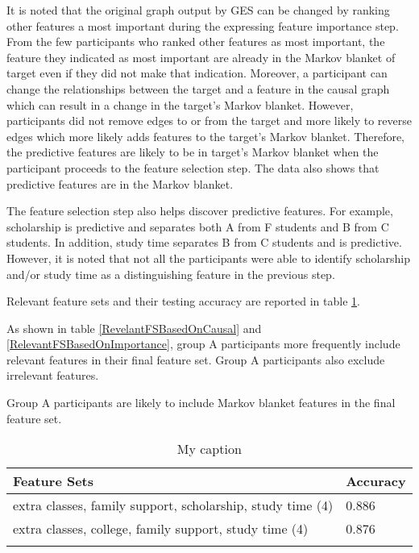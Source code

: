 It is noted that the original graph output by GES can be changed by ranking other features a most important during the expressing feature importance step. From the few participants who ranked other features as most important, the feature they indicated as most important are already in the Markov blanket of target even if they did not make that indication. Moreover, a participant can change the relationships between the target and a feature in the causal graph which can result in a change in the target's Markov blanket. However, participants did not remove edges to or from the target and more likely to reverse edges which more likely adds features to the target's Markov blanket. Therefore, the predictive features are likely to be in target's Markov blanket when the participant proceeds to the feature selection step. The data also shows that predictive features are in the Markov blanket.

The feature selection step also helps discover predictive features. For example, scholarship is predictive and separates both A from F students and B from C students. In addition, study time separates B from C students and is predictive. However, it is noted that not all the participants were able to identify scholarship and/or study time as a distinguishing feature in the previous step.

Relevant feature sets and their testing accuracy are reported in table \ref{relevantFS}.

As shown in table \ref{RevelantFSBasedOnCausal} and \ref{RelevantFSBasedOnImportance}, group A participants more frequently include relevant features in their final feature set. Group A participants also exclude irrelevant features.

Group A participants are likely to include Markov blanket features in the final feature set.

\begin{table}[]
\centering
\begin{tabular}{ll}
\hline
Feature Sets                                               & Accuracy \\ \hline
extra classes, family support, scholarship, study time (4) & 0.886    \\
extra classes, college, family support, study time (4)     & 0.876    \\
                                                           &
\end{tabular}
\caption{My caption}
\label{relevantFS}
\end{table}

